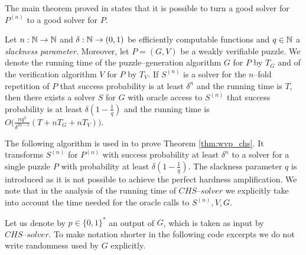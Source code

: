 The main theorem proved in \cite{canetti2004hardness} states that it is possible to turn a good solver for $P^{(n)}$ to a good solver for $P$.
%
\begin{theorem}
  \label{thm:wvp_chs}
Let $n:\mathbb{N} \rightarrow \mathbb{N}$ and $\delta: \mathbb{N} \rightarrow (0,1)$ be efficiently computable functions and $q \in \mathbb{N}$ a \textit{slackness parameter}.
Moreover, let $P = (G,V)$ be a weakly verifiable puzzle. We denote the running time of the
puzzle--generation algorithm $G$ for $P$ by $T_G$ and of the verification algorithm $V$ for $P$ by $T_V$.
If $S^{(n)}$ is a solver for the $n$--fold repetition of $P$ that success probability is at least $\delta^{n}$
and the running time is $T$, then there exists a solver $S$ for $G$ with oracle access to $S^{(n)}$ that success
probability is at least $\delta(1-\frac{1}{q})$ and the running time is $O\Big(\frac{nq^3}{\delta^{2n-1}}(T + nT_G + nT_V)\Big)$.
\end{theorem}
%
The following algorithm is used in \cite{canetti2004hardness} to prove Theorem \ref{thm:wvp_chs}.
It transforms $S^{(n)}$ for $P^{(n)}$ with success probability at least $\delta^{n}$ to a solver for a single puzzle $P$ with probability
at least $\delta(1  - \frac{1}{q})$. The slackness parameter $q$ is introduced as it is not possible to achieve
the perfect hardness amplification. We note that in the analysis of the running time of $\mathit{CHS\text{--}solver}$
we explicitly take into account the time needed for the oracle calls to $S^{(n)}, V, G$.

Let us denote by $p \in \{0,1\}^{*}$ an output of $G$, which is taken as input by $\mathit{CHS\text{--}solver}$.
To make notation shorter in the following code excerpts we do not write randomness used by $G$ explicitly.

